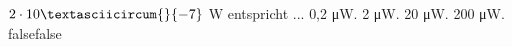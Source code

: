     {$2\cdot 10\textasciicircum{}\{-7\}$ W entspricht ...}
    {0,2 μW.}
    {2 μW.}
    {20 μW.}
    {200 μW.}
    {false}{false}